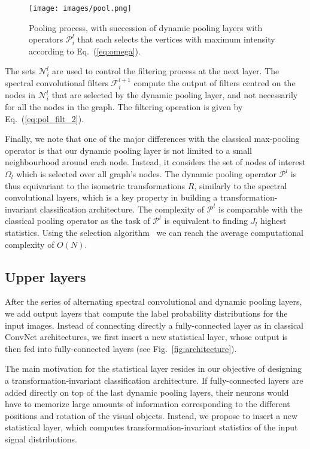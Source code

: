 \documentclass[10pt,journal,compsoc]{IEEEtran}
\begin{document}
	\begin{figure}[!t]
		\centering
		\texttt{[image: images/pool.png]}
		\caption{Pooling process, with succession of dynamic pooling layers with operators $\mathcal{P}_i^{l}$ that each selects the vertices with maximum intensity according to Eq.~(\ref{eq:omega}).
		}
		\label{fig:pool}
	\end{figure}

	The sets $\mathcal{N}_i^{l}$ are used to control the filtering process at the next layer. The spectral convolutional filters $\mathcal{F}_i^{l+1}$ compute the output of filters centred on the nodes in $\mathcal{N}_i^{l}$ that are selected by the dynamic pooling layer, and not necessarily for all the nodes in the graph. The filtering operation is given by Eq.~(\ref{eq:pol_filt_2}).


	Finally, we note that one of the major differences with the classical max-pooling operator is that our dynamic pooling layer is not limited to a small neighbourhood around each node. Instead, it considers the set of nodes of interest $\Omega_l$ which is selected over all graph's nodes. The dynamic pooling operator $\mathcal{P}^{l}$ is thus equivariant to the isometric transformations $R$, similarly to the spectral convolutional layers, which is a key property in building a transformation-invariant classification architecture. The complexity of  $\mathcal{P}^l$ is comparable with the classical pooling operator as the task of $\mathcal{P}^l$ is equivalent to finding $J_l$ highest statistics. Using the selection algorithm~\cite{bb:Knuth98} we can reach the average computational complexity of $O(N)$.

	\subsection{Upper layers}
	\label{s:hist}

	After the series of alternating spectral convolutional and dynamic pooling layers, we add output layers that compute the label probability distributions for the input images. Instead of connecting directly a fully-connected layer as in classical ConvNet architectures, we first insert a new statistical layer, whose output is then fed into fully-connected layers (see Fig.~\ref{fig:architecture}).

	The main motivation for the statistical layer resides in our objective of designing a transformation-invariant classification architecture. If fully-connected layers are added directly on top of the last dynamic pooling layers, their neurons would have to memorize large amounts of information corresponding to the different positions and rotation of the visual objects. Instead, we propose to insert a new statistical layer, which computes transformation-invariant statistics of the input signal distributions.
\end{document}
